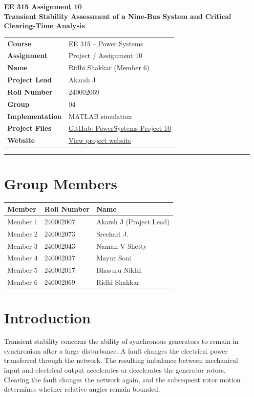 \documentclass[11pt,a4paper]{article}
\begin{document}
\begin{center}\large\textbf{EE 315 Assignment 10}\\[5pt]\Large\textbf{Transient Stability Assessment of a Nine-Bus System and Critical Clearing-Time Analysis}\end{center}
\begin{tabular}{ll}
\textbf{Course}&EE 315 -- Power Systems\\
\textbf{Assignment}&Project / Assignment 10\\
\textbf{Name}&Ridhi Shakkar (Member 6)\\
\textbf{Project Lead}&Akarsh J\\
\textbf{Roll Number}&240002069\\
\textbf{Group}&04\\
\textbf{Implementation}&MATLAB simulation\\
\textbf{Project Files}&\href{https://github.com/pacificblaster1708/PowerSystems-Project-10}{GitHub: PowerSystems-Project-10}\\
\textbf{Website}&\href{https://pacificblaster1708.github.io/PowerSystems-Project-10/}{View project website}
\end{tabular}
\vspace{10pt}\hrule
\section{Group Members}
\begin{center}\begin{tabular}{lll}\toprule Member&Roll Number&Name\\\midrule
Member 1&240002007&Akarsh J (Project Lead)\\
Member 2&240002073&Sreehari J.\\
Member 3&240002043&Naman V Shetty\\
Member 4&240002037&Mayur Soni\\
Member 5&240002017&Bhasuru Nikhil\\
Member 6&240002069&Ridhi Shakkar\\\bottomrule\end{tabular}\end{center}
\section{Introduction}
Transient stability concerns the ability of synchronous generators to remain in synchronism after a large disturbance. A fault changes the electrical power transferred through the network. The resulting imbalance between mechanical input and electrical output accelerates or decelerates the generator rotors. Clearing the fault changes the network again, and the subsequent rotor motion determines whether relative angles remain bounded.
\end{document}
